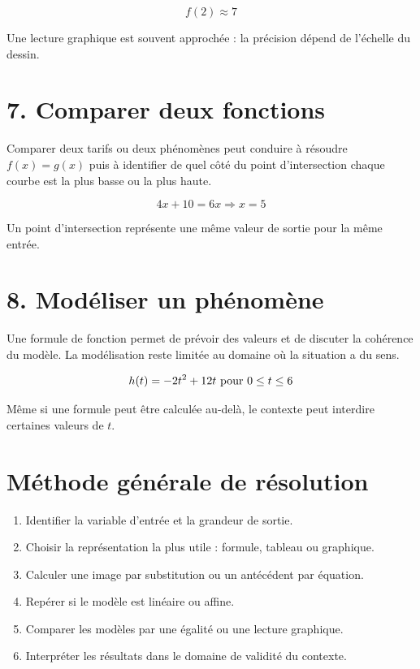 \[
f(2)\approx7
\]

\begin{exemple}
Une lecture graphique est souvent approchée : la précision dépend de l’échelle du dessin.
\end{exemple}

\section{7. Comparer deux fonctions}
Comparer deux tarifs ou deux phénomènes peut conduire à résoudre $f(x)=g(x)$ puis à identifier de quel côté du point d’intersection chaque courbe est la plus basse ou la plus haute.

\[
4x+10=6x\Rightarrow x=5
\]

\begin{exemple}
Un point d’intersection représente une même valeur de sortie pour la même entrée.
\end{exemple}

\section{8. Modéliser un phénomène}
Une formule de fonction permet de prévoir des valeurs et de discuter la cohérence du modèle. La modélisation reste limitée au domaine où la situation a du sens.

\[
h(t)=-2t^2+12t$ pour $0\le t\le6
\]

\begin{exemple}
Même si une formule peut être calculée au-delà, le contexte peut interdire certaines valeurs de $t$.
\end{exemple}

\section{Méthode générale de résolution}
\begin{methode}
\begin{enumerate}
\item Identifier la variable d’entrée et la grandeur de sortie.
\item Choisir la représentation la plus utile : formule, tableau ou graphique.
\item Calculer une image par substitution ou un antécédent par équation.
\item Repérer si le modèle est linéaire ou affine.
\item Comparer les modèles par une égalité ou une lecture graphique.
\item Interpréter les résultats dans le domaine de validité du contexte.
\end{enumerate}
\end{methode}

